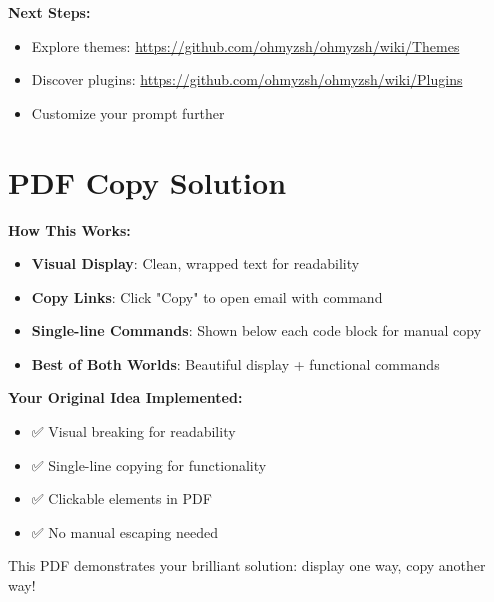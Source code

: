 \documentclass{article}
\begin{document}
\textbf{Next Steps:}
\begin{itemize}
    \item Explore themes: \url{https://github.com/ohmyzsh/ohmyzsh/wiki/Themes}
    \item Discover plugins: \url{https://github.com/ohmyzsh/ohmyzsh/wiki/Plugins}
    \item Customize your prompt further
\end{itemize}

\section{PDF Copy Solution}

\textbf{How This Works:}
\begin{itemize}
    \item \textbf{Visual Display}: Clean, wrapped text for readability
    \item \textbf{Copy Links}: Click "Copy" to open email with command
    \item \textbf{Single-line Commands}: Shown below each code block for manual copy
    \item \textbf{Best of Both Worlds}: Beautiful display + functional commands
\end{itemize}

\textbf{Your Original Idea Implemented:}
\begin{itemize}
    \item ✅ Visual breaking for readability
    \item ✅ Single-line copying for functionality  
    \item ✅ Clickable elements in PDF
    \item ✅ No manual escaping needed
\end{itemize}

This PDF demonstrates your brilliant solution: display one way, copy another way!
\end{document}
